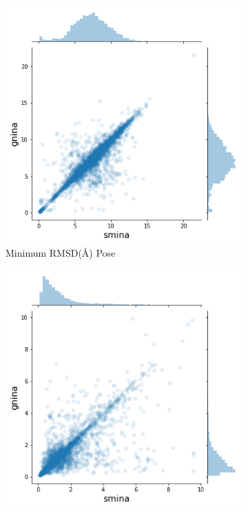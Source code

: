 \documentclass[journal=jcisd8,manuscript=article]{achemso}
\begin{document}
\begin{figure}
    \centering
    \begin{subfigure}[b]{0.48\textwidth}
        \centering
        \includegraphics[width=\textwidth]{figures/minpose.png}
        \caption{Minimum RMSD(\AA) Pose}
        \label{fig:SminaCompareMin}
    \end{subfigure}
    \begin{subfigure}[b]{0.48\textwidth}
        \centering
        \includegraphics[width=\textwidth]{figures/maxpose.png}

\end{subfigure}
\end{figure}
\end{document}
